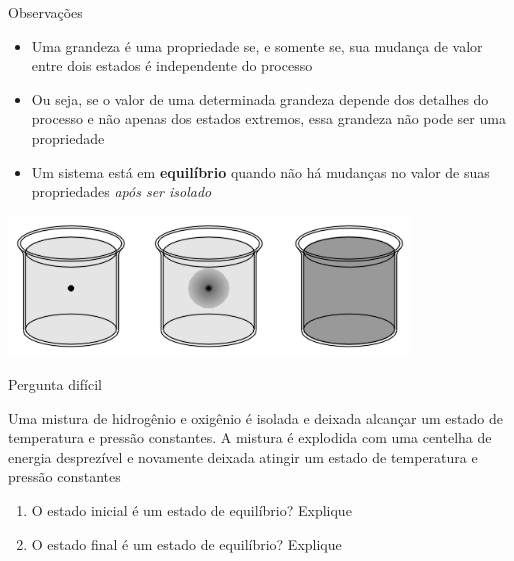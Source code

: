 \begin{frame}{Observações}
    \begin{itemize}
        \item Uma grandeza é uma propriedade se, e somente se, sua mudança de valor
            entre dois estados é independente do processo
        \item Ou seja, se o valor de uma determinada grandeza depende dos detalhes do
            processo e não apenas dos estados extremos, essa grandeza não pode ser uma propriedade
        \item Um sistema está em \textbf{equilíbrio} quando não há mudanças no valor de suas propriedades 
            \textit{após ser isolado}
    \end{itemize}
    \centering
    \includegraphics[width=0.8\textwidth]{images/termo4.png}
\end{frame}

\begin{frame}{Pergunta difícil}
    \begin{minipage}{\textwidth}
        Uma mistura de hidrogênio e oxigênio é isolada e deixada alcançar um estado de temperatura 
        e pressão constantes. A mistura é explodida com uma centelha de energia desprezível e novamente
        deixada atingir um estado de temperatura e pressão constantes
    \end{minipage}
    \begin{enumerate}
        \item O estado inicial é um estado de equilíbrio? Explique
        \item O estado final é um estado de equilíbrio? Explique
    \end{enumerate}
\end{frame}

